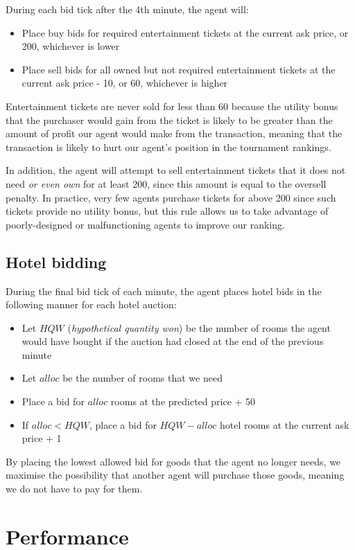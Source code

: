 \documentclass[a4paper]{proc}
\begin{document}
During each bid tick after the 4th minute, the agent will:

\begin{itemize}
  \item Place buy bids for required entertainment tickets at the current ask price, or 200, whichever is lower
  \item Place sell bids for all owned but not required entertainment tickets at the current ask price - 10, or 60, whichever is higher
\end{itemize}

Entertainment tickets are never sold for less than 60 because the utility bonus that the purchaser would gain from the ticket is likely to be greater than the amount of profit our agent would make from the transaction, meaning that the transaction is likely to hurt our agent's position in the tournament rankings.

In addition, the agent will attempt to sell entertainment tickets that it does not need \emph{or even own} for at least 200, since this amount is equal to the oversell penalty. In practice, very few agents purchase tickets for above 200 since such tickets provide no utility bonus, but this rule allows us to take advantage of poorly-designed or malfunctioning agents to improve our ranking.

\subsection{Hotel bidding}

During the final bid tick of each minute, the agent places hotel bids in the following manner for each hotel auction:

\begin{itemize}
  \item Let $HQW$ (\emph{hypothetical quantity won}) be the number of rooms the agent would have bought if the auction had closed at the end of the previous minute
  \item Let $alloc$ be the number of rooms that we need
  \item Place a bid for $alloc$ rooms at the predicted price + 50
  \item If $alloc < HQW$, place a bid for $HQW - alloc$ hotel rooms at the current ask price + 1
\end{itemize}

By placing the lowest allowed bid for goods that the agent no longer needs, we maximise the possibility that another agent will purchase those goods, meaning we do not have to pay for them.

\section{Performance}
\end{document}
